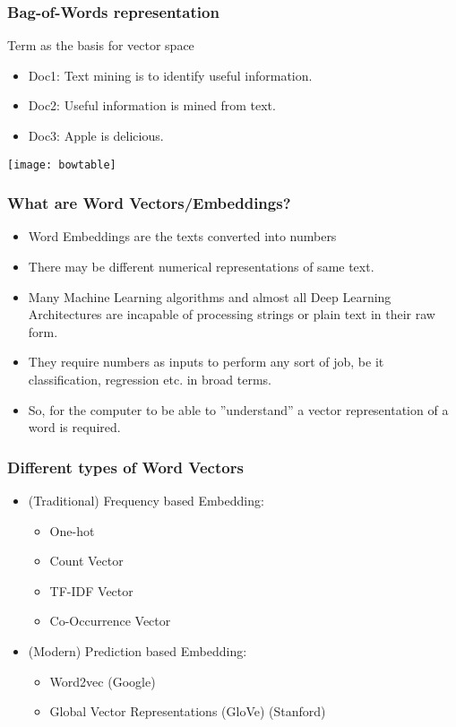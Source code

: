 \begin{frame}[fragile]\frametitle{Bag-of-Words representation}
Term as the basis for vector space
\begin{itemize}
\item Doc1: Text mining is to identify useful information.
\item Doc2: Useful information is mined from text.
\item Doc3: Apple is delicious.
\end{itemize}
\begin{center}
\texttt{[image: bowtable]}
\end{center}
\end{frame}


\begin{frame}[fragile]\frametitle{What are Word Vectors/Embeddings?}
\begin{itemize}
\item Word Embeddings are the texts converted into numbers
\item There may be different numerical representations of  same text. 
\item Many Machine Learning algorithms and almost all Deep Learning Architectures are incapable of processing strings or plain text in their raw form. 
\item They require numbers as inputs to perform any sort of job, be it classification, regression etc. in broad terms.
\item So, for the computer to be able to ''understand'' a vector representation of a word is required.
\end{itemize}
\end{frame}

\begin{frame}[fragile]\frametitle{Different types of Word Vectors}
\begin{itemize}
\item (Traditional) Frequency based Embedding:
\begin{itemize}
\item One-hot
\item Count Vector
\item TF-IDF Vector
\item Co-Occurrence Vector
\end{itemize}
\item (Modern) Prediction based Embedding:
\begin{itemize}
\item Word2vec  (Google)
\item Global Vector Representations (GloVe)   (Stanford)
\end{itemize}
\end{itemize}
\end{frame}



